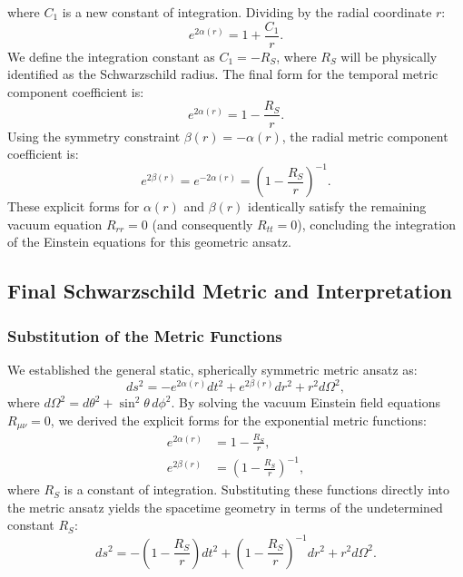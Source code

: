 \documentclass[11pt, a4paper]{report}
\begin{document}
where $C_1$ is a new constant of integration. Dividing by the radial coordinate $r$:
\begin{equation}
e^{2\alpha(r)} = 1 + \frac{C_1}{r}.
\end{equation}
We define the integration constant as $C_1 = -R_S$, where $R_S$ will be physically identified as the Schwarzschild radius. The final form for the temporal metric component coefficient is:
\begin{equation}
e^{2\alpha(r)} = 1 - \frac{R_S}{r}.
\end{equation}
Using the symmetry constraint $\beta(r) = -\alpha(r)$, the radial metric component coefficient is:
\begin{equation}
e^{2\beta(r)} = e^{-2\alpha(r)} = \left( 1 - \frac{R_S}{r} \right)^{-1}.
\end{equation}
These explicit forms for $\alpha(r)$ and $\beta(r)$ identically satisfy the remaining vacuum equation $R_{rr} = 0$ (and consequently $R_{tt} = 0$), concluding the integration of the Einstein equations for this geometric ansatz.


\subsection{Final Schwarzschild Metric and Interpretation}

\subsubsection{Substitution of the Metric Functions}
We established the general static, spherically symmetric metric ansatz as:
\begin{equation}
ds^2 = -e^{2\alpha(r)} dt^2 + e^{2\beta(r)} dr^2 + r^2 d\Omega^2,
\end{equation}
where $d\Omega^2 = d\theta^2 + \sin^2\theta \, d\phi^2$. By solving the vacuum Einstein field equations $R_{\mu\nu} = 0$, we derived the explicit forms for the exponential metric functions:
\begin{align}
e^{2\alpha(r)} &= 1 - \frac{R_S}{r}, \\
e^{2\beta(r)} &= \left( 1 - \frac{R_S}{r} \right)^{-1},
\end{align}
where $R_S$ is a constant of integration. Substituting these functions directly into the metric ansatz yields the spacetime geometry in terms of the undetermined constant $R_S$:
\begin{equation}
ds^2 = -\left( 1 - \frac{R_S}{r} \right) dt^2 + \left( 1 - \frac{R_S}{r} \right)^{-1} dr^2 + r^2 d\Omega^2.
\end{equation}
\end{document}
